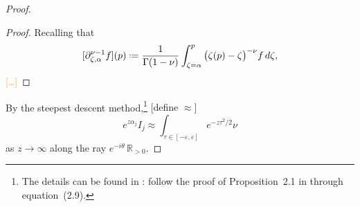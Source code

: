\documentclass{article}
\let\Re\relax
\DeclareMathOperator{\Re}{Re}
\newcommand{\R}{\mathbb{R}}
\newcommand*{\defeq}{\mathrel{\vcenter{\baselineskip0.5ex \lineskiplimit0pt
                     \hbox{\scriptsize.}\hbox{\scriptsize.}}}%
                     =}
\theoremstyle{definition}
\theoremstyle{plain}
\newenvironment{todo}{\color{Coral}}{\color{black}}
\newenvironment{old}{\color{RoyalBlue}}{\color{black}}
\begin{document}
\begin{proof}
\begin{old}
\begin{proof}
Recalling that
\[ [\partial^{\nu-1}_{\zeta, \alpha} f](p) \defeq \frac{1}{\Gamma(1-\nu)} \int_{\zeta = \alpha}^p \big(\zeta(p)-\zeta\big)^{-\nu} f\,d\zeta, \]
\textcolor{orange}{[\ldots]}
\end{proof}

By the steepest descent method,\footnote{The details can be found in \cite{miller2006applied}: follow the proof of Proposition~2.1 in through equation~(2.9).} \begin{todo}[define $\approx$]\end{todo}
\[ e^{z \alpha_j} I_j \approx \int_{\tau \in [-\varepsilon, \varepsilon]} e^{-z\tau^2/2} \nu \]
as $z \to \infty$ along the ray $e^{-i\theta}\, \R_{> 0}$.
\end{old}
\end{proof}
\end{document}
